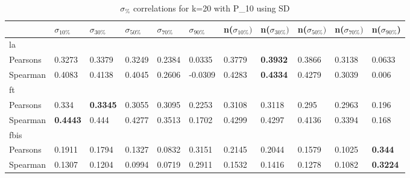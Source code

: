 \documentclass{sig-alternate}
\begin{document}
\begin{table}[h!]
\centering
\begin{tabular}{|l||l|l|l|l|l||l|l|l|l|l|}
\hline
& $\sigma_{10\%}$ & $\sigma_{30\%}$ & $\sigma_{50\%}$ & $\sigma_{70\%}$ & $\sigma_{90\%}$ & n($\sigma_{10\%})$ & n($\sigma_{30\%})$ & n($\sigma_{50\%})$ & n($\sigma_{70\%})$ & n($\sigma_{90\%}$) \\ \hline
\hline la &  &  &  &  &  &  &  &  &  &  \\ \hline
Pearsons & 0.3273 & 0.3379 & 0.3249 & 0.2384 & 0.0335 & 0.3779 & \textbf{0.3932} & 0.3866 & 0.3138 & 0.0633 \\ \hline
Spearman & 0.4083 & 0.4138 & 0.4045 & 0.2606 & -0.0309 & 0.4283 & \textbf{0.4334} & 0.4279 & 0.3039 & 0.006 \\ \hline
\hline ft &  &  &  &  &  &  &  &  &  &  \\ \hline
Pearsons & 0.334 & \textbf{0.3345} & 0.3055 & 0.3095 & 0.2253 & 0.3108 & 0.3118 & 0.295 & 0.2963 & 0.196 \\ \hline
Spearman & \textbf{0.4443} & 0.444 & 0.4277 & 0.3513 & 0.1702 & 0.4299 & 0.4297 & 0.4136 & 0.3394 & 0.168 \\ \hline
\hline fbis &  &  &  &  &  &  &  &  &  &  \\ \hline
Pearsons & 0.1911 & 0.1794 & 0.1327 & 0.0832 & 0.3151 & 0.2145 & 0.2044 & 0.1579 & 0.1025 & \textbf{0.344} \\ \hline
Spearman & 0.1307 & 0.1204 & 0.0994 & 0.0719 & 0.2911 & 0.1532 & 0.1416 & 0.1278 & 0.1082 & \textbf{0.3224} \\ \hline
\end{tabular}
\caption{$\sigma_{\%}$ correlations for k=20 with P\_10 using SD}
\end{table}
\end{document}
